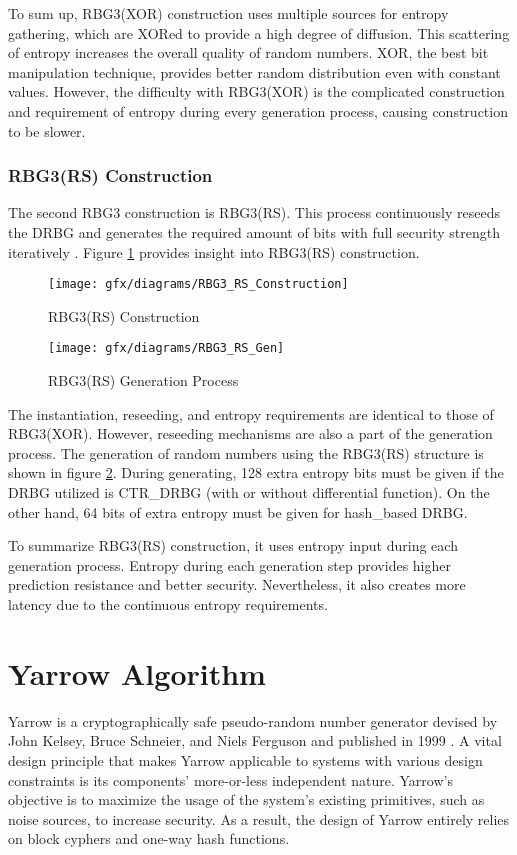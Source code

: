 To sum up, RBG3(XOR) construction uses multiple sources for entropy gathering, which are XORed to provide a high degree of diffusion. This scattering of entropy increases the overall quality of random numbers. XOR, the best bit manipulation technique, provides better random distribution even with constant values. However, the difficulty with RBG3(XOR) is the complicated construction and requirement of entropy during every generation process, causing construction to be slower.

%
%
\subsubsection{RBG3(RS) Construction}
\label{subsubsec:SoA:RBG3:RS}
The second RBG3 construction is RBG3(RS). This process continuously reseeds the DRBG and generates the required amount of bits with full security strength iteratively \cite{SP90C-2022}. Figure \ref{fig:3:7} provides insight into RBG3(RS) construction.

\begin{figure}[!h]
	\centering
	\texttt{[image: gfx/diagrams/RBG3\_RS\_Construction]}
	\caption{RBG3(RS) Construction}
	\label{fig:3:7}
\end{figure}
\begin{figure}[!h]
	\centering
	\texttt{[image: gfx/diagrams/RBG3\_RS\_Gen]}
	\caption{RBG3(RS) Generation Process}
	\label{fig:3:8}
\end{figure}

The instantiation, reseeding, and entropy requirements are identical to those of RBG3(XOR). However, reseeding mechanisms are also a part of the generation process. The generation of random numbers using the RBG3(RS) structure is shown in figure \ref{fig:3:8}. During generating, 128 extra entropy bits must be given if the DRBG utilized is CTR\_DRBG (with or without differential function). On the other hand, 64 bits of extra entropy must be given for hash\_based DRBG.

To summarize RBG3(RS) construction, it uses entropy input during each generation process. Entropy during each generation step provides higher prediction resistance and better security. Nevertheless, it also creates more latency due to the continuous entropy requirements.

%
%
\section{Yarrow Algorithm}
\label{sec:SoA:YA}
Yarrow is a cryptographically safe pseudo-random number generator devised by John Kelsey, Bruce Schneier, and Niels Ferguson and published in 1999 \cite{YR-1999}. A vital design principle that makes Yarrow applicable to systems with various design constraints is its components’ more-or-less independent nature. Yarrow’s objective is to maximize the usage of the system’s existing primitives, such as noise sources, to increase security. As a result, the design of Yarrow entirely relies on block cyphers and one-way hash functions.

